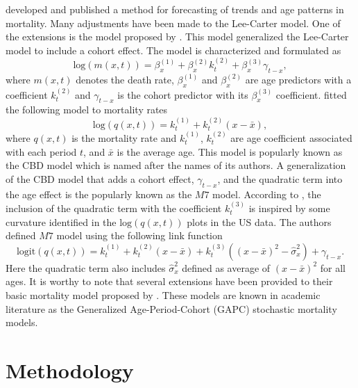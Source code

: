\documentclass[11pt,letterpaper]{article}
\numberwithin{equation}{section}
\begin{document}
\cite{Lee+Carter:1992} developed and published a method for forecasting of trends and age patterns in mortality.  Many adjustments have been made to the Lee-Carter model. One of the extensions is the model proposed by \cite{Renshaw+Haberman:2006}. This model generalized the Lee-Carter model to include a cohort effect. The model is characterized and formulated as
\begin{equation}\label{eq:p2}
\text{log}(m(x,t))=\beta_x^{(1)}+ \beta_x^{(2)}k_t^{(2)}+ \beta_x^{(3)}\gamma_{t-x},
\end{equation}
where $m(x,t)$ denotes the death rate, $\beta_x^{(1)}$ and $\beta_x^{(2)}$ are age predictors with a coefficient $k_t^{(2)}$ and $\gamma_{t-x}$ is the cohort predictor with its $\beta_x^{(3)}$ coefficient. \cite{Cairns+Blake+Dowd:2006} fitted the following model to mortality rates
\begin{equation}\label{eq:p3}
\text{log}(q(x,t))=k_t^{(1)}+ k_t^{(2)}(x - \bar{x}),
\end{equation}
where $q(x,t)$ is the mortality rate and $k_t^{(1)}$, $k_t^{(2)}$ are age coefficient associated with each period $t$, and $\bar{x}$ is the average age. This model is popularly known as the CBD model which is named after the names of its authors. A generalization of the CBD model that adds a cohort effect, $\gamma_{t-x}$, and the quadratic term into the age effect is the popularly known as the $M7$ model. According to \cite{Cairns+Blake+Dowd+Coughlan+Epstein+Khalaf+Allah:2011}, the inclusion of the quadratic term with the coefficient $k_t^{(3)}$ is inspired by some curvature identified in the $\text{log}(q(x,t))$ plots in the US data. The authors defined $M7$ model using the following link function
\begin{equation}\label{eq:p4}
\text{logit}(q(x,t))=k_t^{(1)}+ k_t^{(2)}(x - \bar{x}) + k_t^{(3)}((x - \bar{x})^{2} - \hat\sigma_x^{2}) + \gamma_{t-x}.
\end{equation}
Here the quadratic term also includes $\hat\sigma_x^{2}$ defined as average of $(x - \bar{x})^{2}$ for all ages.
It is worthy to note that several extensions have been provided to their basic mortality model proposed by \cite{Cairns+Blake+Dowd+Coughlan+Epstein+Ong+Balevich:2009}. These models are known in academic literature as the Generalized Age-Period-Cohort (GAPC) stochastic mortality models.

\section{Methodology}\label{sec:methodology}
\end{document}
